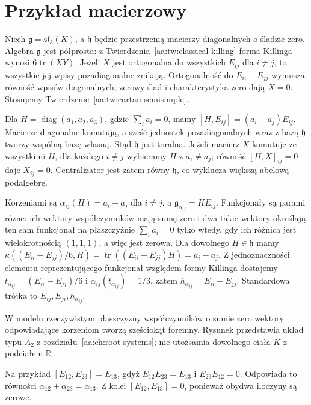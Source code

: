 \section{Przykład macierzowy}

\begin{przyklad}[$\mathfrak{sl}_3(K)$]
\label{aa:prz:sl3-root-decomposition}
Niech $\mathfrak g=\mathfrak{sl}_3(K)$, a $\mathfrak h$ będzie przestrzenią macierzy diagonalnych o śladzie zero. Algebra $\mathfrak g$ jest półprosta: z Twierdzenia~\ref{aa:tw:classical-killing} forma Killinga wynosi $6\operatorname{tr}(XY)$. Jeżeli $X$ jest ortogonalna do wszystkich $E_{ij}$ dla $i\ne j$, to wszystkie jej wpisy pozadiagonalne znikają. Ortogonalność do $E_{ii}-E_{jj}$ wymusza równość wpisów diagonalnych; zerowy ślad i charakterystyka zero dają $X=0$. Stosujemy Twierdzenie~\ref{aa:tw:cartan-semisimple}.

Dla $H=\operatorname{diag}(a_1,a_2,a_3)$, gdzie $\sum_i a_i=0$, mamy
$[H,E_{ij}]=(a_i-a_j)E_{ij}$. Macierze diagonalne komutują, a sześć jednostek pozadiagonalnych wraz z bazą $\mathfrak h$ tworzy wspólną bazę własną. Stąd $\mathfrak h$ jest toralna. Jeżeli macierz $X$ komutuje ze wszystkimi $H$, dla każdego $i\ne j$ wybieramy $H$ z $a_i\ne a_j$; równość $[H,X]_{ij}=0$ daje $X_{ij}=0$. Centralizator jest zatem równy $\mathfrak h$, co wyklucza większą abelową podalgebrę.

Korzeniami są $\alpha_{ij}(H)=a_i-a_j$ dla $i\ne j$, a $\mathfrak g_{\alpha_{ij}}=KE_{ij}$. Funkcjonały są parami różne: ich wektory współczynników mają sumę zero i dwa takie wektory określają ten sam funkcjonał na płaszczyźnie $\sum_i a_i=0$ tylko wtedy, gdy ich różnica jest wielokrotnością $(1,1,1)$, a więc jest zerowa. Dla dowolnego $H\in\mathfrak h$ mamy $\kappa((E_{ii}-E_{jj})/6,H)=\operatorname{tr}((E_{ii}-E_{jj})H)=a_i-a_j$. Z jednoznaczności elementu reprezentującego funkcjonał względem formy Killinga dostajemy
$t_{\alpha_{ij}}=(E_{ii}-E_{jj})/6$ i $\alpha_{ij}(t_{\alpha_{ij}})=1/3$, zatem $h_{\alpha_{ij}}=E_{ii}-E_{jj}$. Standardowa trójka to $E_{ij},E_{ji},h_{\alpha_{ij}}$.

W modelu rzeczywistym płaszczyzny współczynników o sumie zero wektory odpowiadające korzeniom tworzą sześciokąt foremny. Rysunek przedstawia układ typu $A_2$ z rozdziału~\ref{aa:ch:root-systems}; nie utożsamia dowolnego ciała $K$ z podciałem $\mathbb R$.
\begin{center}
\end{center}
Na przykład $[E_{12},E_{23}]=E_{13}$, gdyż $E_{12}E_{23}=E_{13}$ i $E_{23}E_{12}=0$. Odpowiada to równości $\alpha_{12}+\alpha_{23}=\alpha_{13}$. Z kolei $[E_{12},E_{13}]=0$, ponieważ obydwa iloczyny są zerowe.
\end{przyklad}

